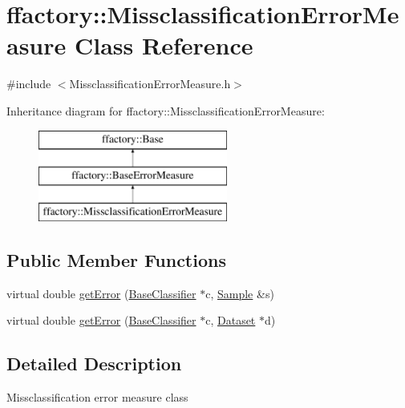 \hypertarget{classffactory_1_1_missclassification_error_measure}{\section{ffactory\-:\-:Missclassification\-Error\-Measure Class Reference}
\label{classffactory_1_1_missclassification_error_measure}
}


{\ttfamily \#include $<$Missclassification\-Error\-Measure.\-h$>$}

Inheritance diagram for ffactory\-:\-:Missclassification\-Error\-Measure\-:\begin{figure}[H]
\begin{center}
\leavevmode
\includegraphics[height=3.000000cm]{classffactory_1_1_missclassification_error_measure}
\end{center}
\end{figure}
\subsection*{Public Member Functions}
\begin{DoxyCompactItemize}
\item 
virtual double \hyperlink{classffactory_1_1_missclassification_error_measure_adedf3d4ccccf1dd24995d9e5d109afd3}{get\-Error} (\hyperlink{classffactory_1_1_base_classifier}{Base\-Classifier} $\ast$c, \hyperlink{classffactory_1_1_sample}{Sample} \&s)
\item 
virtual double \hyperlink{classffactory_1_1_missclassification_error_measure_a962d88274011caaba227e7c7f6ce3bdf}{get\-Error} (\hyperlink{classffactory_1_1_base_classifier}{Base\-Classifier} $\ast$c, \hyperlink{classffactory_1_1_dataset}{Dataset} $\ast$d)
\end{DoxyCompactItemize}


\subsection{Detailed Description}
Missclassification error measure class 

